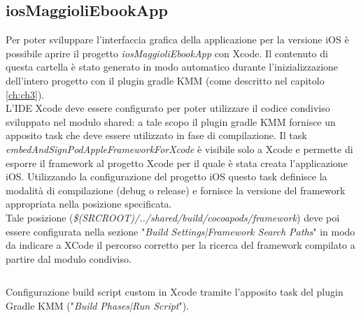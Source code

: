 \subsection{iosMaggioliEbookApp}

Per poter sviluppare l'interfaccia grafica della applicazione per la versione iOS è possibile aprire il progetto \textit{iosMaggioliEbookApp} con Xcode. Il contenuto di questa cartella è stato generato in modo automatico durante l'inizializzazione dell'intero progetto con il plugin gradle KMM (come descritto nel capitolo \ref{ch:ch3}).\\
L'IDE Xcode deve essere configurato per poter utilizzare il codice condiviso sviluppato nel modulo shared: a tale scopo il plugin gradle KMM fornisce un apposito task che deve essere utilizzato in fase di compilazione. Il task \textit{embedAndSignPodAppleFrameworkForXcode} è visibile solo a Xcode e permette di esporre il framework al progetto Xcode per il quale è stata creata l'applicazione iOS. Utilizzando la configurazione del progetto iOS questo task definisce la modalità di compilazione (debug o release) e fornisce la versione del framework appropriata nella posizione specificata.\\
Tale posizione (\textit{\$(SRCROOT)/../shared/build/cocoapods/framework}) deve poi essere configurata nella sezione "\textit{Build Settings|Framework Search Paths}" in modo da indicare a XCode il percorso corretto per la ricerca del framework compilato a partire dal modulo condiviso.

\begin{listing}[H]
\inputminted{bash}{code/5-xcodeconfigkmm}
\caption{Configurazione build script custom in Xcode tramite l'apposito task del plugin Gradle KMM ("\textit{Build Phases|Run Script}").}
\end{listing}

